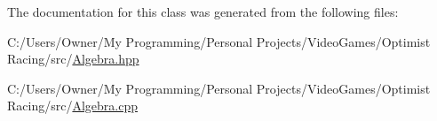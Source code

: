 The documentation for this class was generated from the following files\-:\begin{DoxyCompactItemize}
\item 
C\-:/\-Users/\-Owner/\-My Programming/\-Personal Projects/\-Video\-Games/\-Optimist Racing/src/\hyperlink{_algebra_8hpp}{Algebra.\-hpp}\item 
C\-:/\-Users/\-Owner/\-My Programming/\-Personal Projects/\-Video\-Games/\-Optimist Racing/src/\hyperlink{_algebra_8cpp}{Algebra.\-cpp}\end{DoxyCompactItemize}
